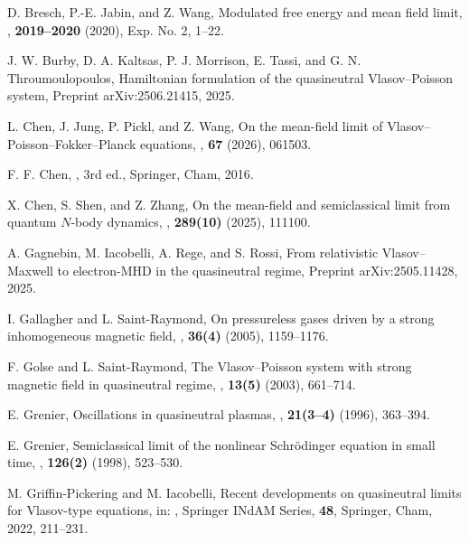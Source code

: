 \documentclass[11pt,reqno]{amsart}
\numberwithin{equation}{section}
\begin{document}
\begin{thebibliography}{}
D. Bresch, P.-E. Jabin, and Z. Wang,
\newblock Modulated free energy and mean field limit,
, {\bf 2019--2020} (2020), Exp. No. 2, 1--22.

J. W. Burby, D. A. Kaltsas, P. J. Morrison, E. Tassi, and
G. N. Throumoulopoulos,
\newblock Hamiltonian formulation of the quasineutral
Vlasov--Poisson system,
\newblock Preprint arXiv:2506.21415, 2025.

L. Chen, J. Jung, P. Pickl, and Z. Wang,
\newblock On the mean-field limit of
Vlasov--Poisson--Fokker--Planck equations,
, {\bf 67} (2026), 061503.

F. F. Chen,
, 3rd ed.,
\newblock Springer, Cham, 2016.

X. Chen, S. Shen, and Z. Zhang,
\newblock On the mean-field and semiclassical limit from quantum $N$-body dynamics,
, {\bf 289(10)} (2025), 111100.

A. Gagnebin, M. Iacobelli, A. Rege, and S. Rossi,
\newblock From relativistic Vlasov--Maxwell to electron-MHD in the quasineutral regime,
\newblock Preprint arXiv:2505.11428, 2025.

I. Gallagher and L. Saint-Raymond,
\newblock On pressureless gases driven by a strong inhomogeneous magnetic field,
, {\bf 36(4)} (2005), 1159--1176.

F. Golse and L. Saint-Raymond,
\newblock The Vlasov--Poisson system with strong magnetic field in quasineutral regime,
, {\bf 13(5)} (2003), 661--714.

E. Grenier,
\newblock Oscillations in quasineutral plasmas,
,
{\bf 21(3--4)} (1996), 363--394.

E. Grenier,
\newblock Semiclassical limit of the nonlinear Schr{\"o}dinger equation in small time,
, {\bf 126(2)} (1998), 523--530.

M. Griffin-Pickering and M. Iacobelli,
\newblock Recent developments on quasineutral limits for Vlasov-type equations, in:
, Springer INdAM Series, {\bf 48}, Springer, Cham, 2022, 211--231.


\end{thebibliography}
\end{document}
